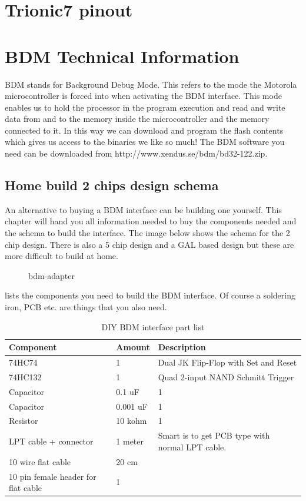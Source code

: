 \documentclass[11pt,a4paper]{book}
\newcommand{\Mfig}[1]{%
\begin{figure}
    \centering
    \missingfigure{#1}
    \caption{#1}
\end{figure}}
\begin{document}
\chapter{Trionic7 pinout}


\chapter{BDM Technical Information}
BDM stands for Background Debug Mode. This refers to the mode the Motorola
microcontroller is forced into when activating the BDM interface. This mode
enables us to hold the processor in the program execution and read and write
data from and to the memory inside the microcontroller and the memory connected
to it. In this way we can download and program the flash contents which gives us
access to the binaries we like so much! The BDM software you need can be
downloaded from http://www.xendus.se/bdm/bd32-122.zip.

\section{Home build 2 chips design schema}
An alternative to buying a BDM interface can be building one yourself. This chapter will hand you all
information needed to buy the components needed and the schema to build the interface. The image
below shows the schema for the 2 chip design. There is also a 5 chip design and a GAL based design
but these are more difficult to build at home.

\Mfig{bdm-adapter}

 lists the components you need to build the BDM interface. Of course a soldering
iron, PCB etc. are things that you also need.

\begin{table}
    \centering
    \begin{tabular}{lll}
        Component & Amount & Description \\
        \midrule
        74HC74 & 1 & Dual JK Flip-Flop with Set and Reset \\
        74HC132 & 1&  Quad 2-input NAND Schmitt Trigger \\
        Capacitor &0.1 uF& 1 \\
        Capacitor &0.001 uF& 1 \\
        Resistor &10 kohm & 1 \\
        LPT cable + connector &1 meter& Smart is to get PCB type with normal LPT cable.
        \\
        10 wire flat cable &20 cm  & \\
        10 pin female header for flat cable & 1
    \end{tabular}
    \caption{DIY BDM interface part list}
    \label{tab:bdm-part-list}
\end{table}
\end{document}
